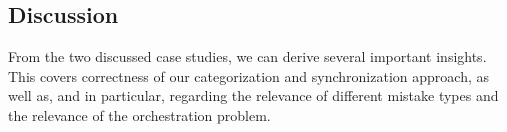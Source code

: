 






\subsection{Discussion}

From the two discussed case studies, we can derive several important insights.
This covers correctness of our categorization and synchronization approach, as well as, and in particular, regarding the relevance of different mistake types and the relevance of the orchestration problem.

